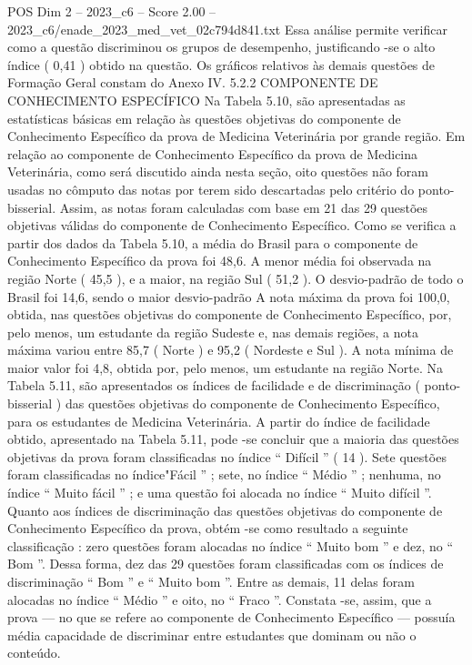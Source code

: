 \begin{textsample}{POS Dim 2 – 2023\_c6 – Score 2.00 – 2023\_c6/enade\_2023\_med\_vet\_02c794d841.txt}
Essa análise permite verificar como a questão discriminou os grupos de desempenho, justificando -se o alto índice ( 0,41 ) obtido na questão.
Os gráficos relativos às demais questões de Formação Geral constam do Anexo IV. 5.2.2 COMPONENTE DE CONHECIMENTO ESPECÍFICO Na Tabela 5.10, são apresentadas as estatísticas básicas em relação às questões objetivas do componente de Conhecimento Específico da prova de Medicina Veterinária por grande região.
Em relação ao componente de Conhecimento Específico da prova de Medicina Veterinária, como será discutido ainda nesta seção, oito questões não foram usadas no cômputo das notas por terem sido descartadas pelo critério do ponto-bisserial.
Assim, as notas foram calculadas com base em 21 das 29 questões objetivas válidas do componente de Conhecimento Específico.
Como se verifica a partir dos dados da Tabela 5.10, a média do Brasil para o componente de Conhecimento Específico da prova foi 48,6.
A menor média foi observada na região Norte ( 45,5 ), e a maior, na região Sul ( 51,2 ).
O desvio-padrão de todo o Brasil foi 14,6, sendo o maior desvio-padrão A nota máxima da prova foi 100,0, obtida, nas questões objetivas do componente de Conhecimento Específico, por, pelo menos, um estudante da região Sudeste e, nas demais regiões, a nota máxima variou entre 85,7 ( Norte ) e 95,2 ( Nordeste e Sul ).
A nota mínima de maior valor foi 4,8, obtida por, pelo menos, um estudante na região Norte.
Na Tabela 5.11, são apresentados os índices de facilidade e de discriminação ( ponto-bisserial ) das questões objetivas do componente de Conhecimento Específico, para os estudantes de Medicina Veterinária.
A partir do índice de facilidade obtido, apresentado na Tabela 5.11, pode -se concluir que a maioria das questões objetivas da prova foram classificadas no índice “ Difícil ” ( 14 ).
Sete questões foram classificadas no índice"Fácil ” ; sete, no índice “ Médio ” ; nenhuma, no índice “ Muito fácil ” ; e uma questão foi alocada no índice “ Muito difícil ”.
Quanto aos índices de discriminação das questões objetivas do componente de Conhecimento Específico da prova, obtém -se como resultado a seguinte classificação : zero questões foram alocadas no índice “ Muito bom ” e dez, no “ Bom ”.
Dessa forma, dez das 29 questões foram classificadas com os índices de discriminação “ Bom ” e “ Muito bom ”.
Entre as demais, 11 delas foram alocadas no índice “ Médio ” e oito, no “ Fraco ”.
Constata -se, assim, que a prova — no que se refere ao componente de Conhecimento Específico — possuía média capacidade de discriminar entre estudantes que dominam ou não o conteúdo.

\end{textsample}
